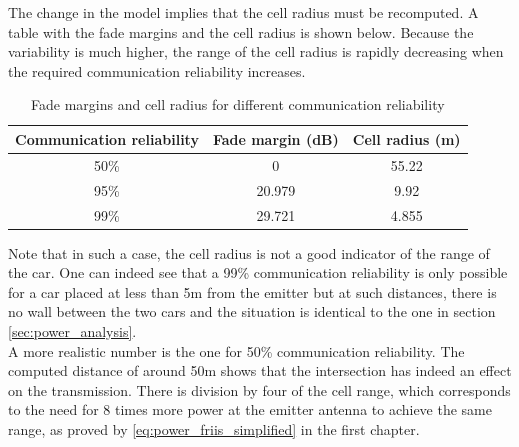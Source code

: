 \documentclass[10pt,a4paper]{ULBreport}
\begin{document}
The change in the model implies that the cell radius must be recomputed. A table with the fade margins and the cell radius is shown below. Because the variability is much higher, the range of the cell radius is rapidly decreasing when the required communication reliability increases. \\

\begin{table}[H]
    \centering
    \begin{tabular}{|c|c|c|}
        \hline
        Communication reliability & Fade margin (dB) & Cell radius (m) \\ \hline
        50\% & 0 & 55.22 \\ \hline
        95\% & 20.979 & 9.92 \\ \hline
        99\% & 29.721 & 4.855 \\ \hline
    \end{tabular}
    \caption{Fade margins and cell radius for different communication reliability}
    \label{tab:fade_margins_2}
\end{table}

Note that in such a case, the cell radius is not a good indicator of the range of the car. One can indeed see that a 99\% communication reliability is only possible for a car placed at less than 5m from the emitter but at such distances, there is no wall between the two cars and the situation is identical to the one in section \ref{sec:power_analysis}. \\
A more realistic number is the one for 50\% communication reliability. The computed distance of around 50m shows that the intersection has indeed an effect on the transmission. There is division by four of the cell range, which corresponds to the need for 8 times more power at the emitter antenna to achieve the same range, as proved by \ref{eq:power_friis_simplified} in the first chapter. \\



\end{document}

